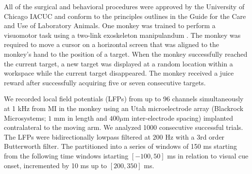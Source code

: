 \documentclass[letterpaper, 9pt, conference]{ieeeconf}
\begin{document}
All of the surgical and behavioral procedures were approved by the
University of Chicago IACUC and conform to the principles outlines
in the Guide for the Care and Use of Laboratory Animals. One
monkey was trained to perform a visuomotor task using a two-link
exoskeleton manipulandum \cite{ref:Scott99}. The monkey was
required to move a cursor on a horizontal screen that was aligned
to the monkey's hand to the position of a target. When the monkey
successfully reached the current target, a new target was
displayed at a random location within a workspace while the
current target disappeared. The monkey received a juice reward
after successfully acquiring five or seven consecutive targets.

We recorded local field potentials (LFPs) from up to 96 channels simultaneously at 1 kHz from MI in
the monkey using an Utah microelectrode array (Blackrock
Microsystems; $1$ mm in length and $400 \mu$m inter-electrode
spacing) implanted contralateral to the moving arm. We analyzed 1000 consecutive
successful trials. The LFPs were bidirectionally lowpass filtered at $200$ Hz with a 3rd order Butterworth filter. The partitioned into a series of windows of 150 ms starting from  the following time windows istarting  $[-100, 50]$ ms in relation to visual cue onset, incremented by 10 ms up to 
$[200, 350]$ ms.
\end{document}
